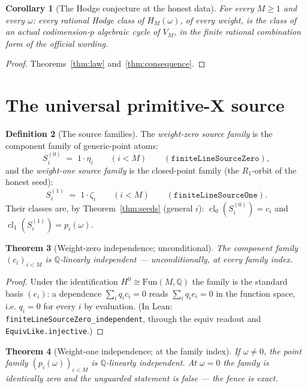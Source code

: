 \documentclass[11pt,a4paper]{article}
\theoremstyle{plain}
\newtheorem{theorem}{Theorem}[section]
\newtheorem{corollary}[theorem]{Corollary}
\theoremstyle{definition}
\newtheorem{definition}[theorem]{Definition}
\newcommand{\Q}{\mathbb{Q}}
\newcommand{\cl}{\operatorname{cl}}
\begin{document}
\begin{corollary}[The Hodge conjecture at the honest data]
\label{cor:hodge-at-data}
For every $M \ge 1$ and every $\omega$: every rational Hodge class of
$H_M(\omega)$, of every weight, is the class of an actual
codimension-$p$ algebraic cycle of $V_M$, in the finite rational
combination form of the official wording.
\end{corollary}

\begin{proof}
Theorems~\ref{thm:law} and~\ref{thm:consequence}.
\end{proof}

\section{The universal primitive-X source}\label{sec:source}

\begin{definition}[The source families]\label{def:families}
The \emph{weight-zero source family} is the component family of
generic-point atoms:
\[
S^{(0)}_i \;=\; 1 \cdot \eta_i \qquad (i < M)
\qquad
(\texttt{finiteLineSourceZero}),
\]
and the \emph{weight-one source family} is the closed-point family
(the $R_1$-orbit of the honest seed):
\[
S^{(1)}_i \;=\; 1 \cdot \zeta_i \qquad (i < M)
\qquad
(\texttt{finiteLineSourceOne}).
\]
Their classes are, by Theorem~\ref{thm:seeds} (general $i$):
$\cl_0(S^{(0)}_i) = c_i$ and $\cl_1(S^{(1)}_i) = p_i(\omega)$.
\end{definition}

\begin{theorem}[Weight-zero independence; unconditional]
\label{thm:ind0}
The component family $(c_i)_{i<M}$ is $\Q$-linearly independent ---
unconditionally, at every family index.
\end{theorem}

\begin{proof}
Under the identification $H^0 \cong \mathrm{Fun}(M,\Q)$ the family is
the standard basis $(e_i)$: a dependence $\sum_i q_i c_i = 0$ reads
$\sum_i q_i e_i = 0$ in the function space, i.e. $q_i = 0$ for every
$i$ by evaluation.  (In Lean:
\texttt{finiteLineSourceZero\_independent}, through the equiv
readout and \texttt{EquivLike.injective}.)
\end{proof}

\begin{theorem}[Weight-one independence; at the family index]
\label{thm:ind1}
If $\omega \ne 0$, the point family $(p_i(\omega))_{i<M}$ is
$\Q$-linearly independent.  \emph{At $\omega = 0$ the family is
identically zero and the unguarded statement is false --- the fence is
exact.}
\end{theorem}
\end{document}

